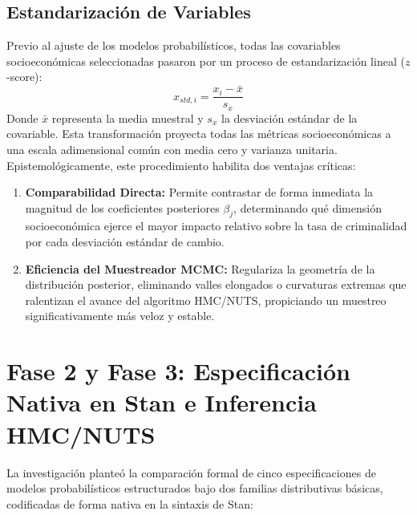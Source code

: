 \documentclass[11pt,a4paper]{article}
\begin{document}
\subsection{Estandarización de Variables}
Previo al ajuste de los modelos probabilísticos, todas las covariables socioeconómicas seleccionadas pasaron por un proceso de estandarización lineal ($z$-score):
\begin{equation}
    x_{std, i} = \frac{x_i - \bar{x}}{s_x}
\end{equation}
Donde $\bar{x}$ representa la media muestral y $s_x$ la desviación estándar de la covariable. Esta transformación proyecta todas las métricas socioeconómicas a una escala adimensional común con media cero y varianza unitaria. Epistemológicamente, este procedimiento habilita dos ventajas críticas:
\begin{enumerate}
    \item \textbf{Comparabilidad Directa:} Permite contrastar de forma inmediata la magnitud de los coeficientes posteriores $\beta_j$, determinando qué dimensión socioeconómica ejerce el mayor impacto relativo sobre la tasa de criminalidad por cada desviación estándar de cambio.
    \item \textbf{Eficiencia del Muestreador MCMC:} Regulariza la geometría de la distribución posterior, eliminando valles elongados o curvaturas extremas que ralentizan el avance del algoritmo HMC/NUTS, propiciando un muestreo significativamente más veloz y estable.
\end{enumerate}

\section{Fase 2 y Fase 3: Especificación Nativa en Stan e Inferencia HMC/NUTS}
La investigación planteó la comparación formal de cinco especificaciones de modelos probabilísticos estructurados bajo dos familias distributivas básicas, codificadas de forma nativa en la sintaxis de Stan:
\end{document}
